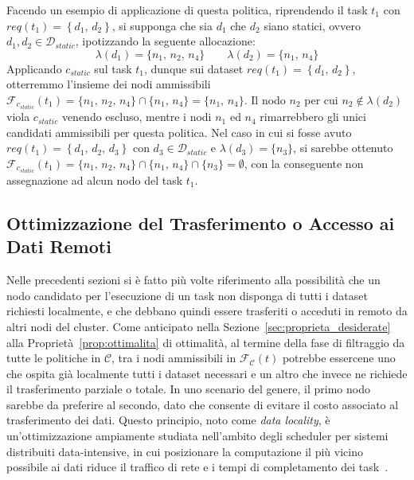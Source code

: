 Facendo un esempio di applicazione di questa politica, riprendendo il task $t_1$ con $req(t_1) = \left\{ d_1,\, d_2 \right\}$, si supponga che sia $d_1$ che $d_2$ siano statici, ovvero $d_1, d_2 \in \mathcal{D}_{static}$, ipotizzando la seguente allocazione:
\begin{equation}
    \lambda(d_1) = \{n_1,\, n_2,\, n_4\} \qquad \lambda(d_2) = \{n_1,\, n_4\} 
\end{equation}
Applicando $c_{static}$ sul task $t_1$, dunque sui dataset $req(t_1) = \left\{ d_1,\, d_2 \right\}$, otterremmo l'insieme dei nodi ammissibili $\mathcal{F}_{c_{static}}(t_1) = \{n_1,\, n_2,\, n_4\} \cap \{n_1,\, n_4\} = \{n_1,\, n_4\}$. Il nodo $n_2$ per cui $n_2 \notin \lambda(d_2)$ viola $c_{static}$ venendo escluso, mentre i nodi $n_1$ ed $n_4$ rimarrebbero gli unici candidati ammissibili per questa politica. Nel caso in cui si fosse avuto $req(t_1) = \left\{ d_1,\, d_2,\, d_3 \right\}$ con $d_3 \in \mathcal{D}_{static}$ e $\lambda(d_3) = \{n_3\}$, si sarebbe ottenuto $\mathcal{F}_{c_{static}}(t_1) = \{n_1,\, n_2,\, n_4\} \cap \{n_1,\, n_4\} \cap \{n_3\} = \emptyset$, con la conseguente non assegnazione ad alcun nodo del task $t_1$.
 

\subsection{Ottimizzazione del Trasferimento o Accesso ai Dati Remoti}
\label{subsec:indicatore_transfer}

Nelle precedenti sezioni si è fatto più volte riferimento alla possibilità che un nodo candidato per l'esecuzione di un task non disponga di tutti i dataset richiesti localmente, e che debbano quindi essere trasferiti o acceduti in remoto da altri nodi del cluster. Come anticipato nella Sezione~\ref{sec:proprieta_desiderate} alla Proprietà~\ref{prop:ottimalita} di ottimalità, al termine della fase di filtraggio da tutte le politiche in $\mathcal{C}$, tra i nodi ammissibili in $\mathcal{F_C}(t)$ potrebbe essercene uno che ospita già localmente tutti i dataset necessari e un altro che invece ne richiede il trasferimento parziale o totale. In uno scenario del genere, il primo nodo sarebbe da preferire al secondo, dato che consente di evitare il costo associato al trasferimento dei dati. Questo principio, noto come \emph{data locality}, è un'ottimizzazione ampiamente studiata nell'ambito degli scheduler per sistemi distribuiti data-intensive, in cui posizionare la computazione il più vicino possibile ai dati riduce il traffico di rete e i tempi di completamento dei task~\cite{data-locality-investigation-mapreduce, delay-scheduling}.

